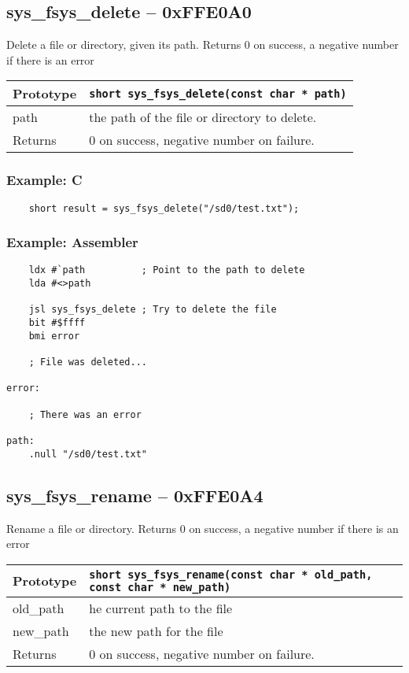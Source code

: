 \subsection*{sys\_fsys\_delete -- 0xFFE0A0}
Delete a file or directory, given its path. Returns 0 on success, a negative number if there is an error

\bigskip

\begin{tabular}{|l||l|} \hline
Prototype & \lstinline!short sys_fsys_delete(const char * path)! \\ \hline
path & the path of the file or directory to delete. \\ \hline
Returns & 0 on success, negative number on failure. \\ \hline
\end{tabular}

\subsubsection*{Example: C}
\begin{lstlisting}
    short result = sys_fsys_delete("/sd0/test.txt");
\end{lstlisting}

\subsubsection*{Example: Assembler}
\begin{verbatim}
    ldx #`path          ; Point to the path to delete
    lda #<>path

    jsl sys_fsys_delete ; Try to delete the file
    bit #$ffff
    bmi error

    ; File was deleted...

error:

    ; There was an error

path:
    .null "/sd0/test.txt"
\end{verbatim}


\subsection*{sys\_fsys\_rename -- 0xFFE0A4}
Rename a file or directory. Returns 0 on success, a negative number if there is an error

\bigskip

\begin{tabular}{|l||l|} \hline
Prototype & \lstinline!short sys_fsys_rename(const char * old_path, const char * new_path)! \\ \hline
old\_path & he current path to the file \\ \hline
new\_path & the new path for the file \\ \hline
Returns & 0 on success, negative number on failure. \\ \hline
\end{tabular}

